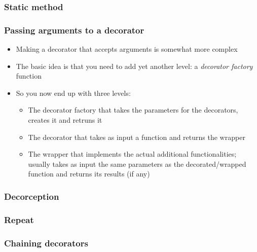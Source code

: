 \documentclass[9pt]{beamer}
\begin{document}
\begin{frame}
  \frametitle{Static method}
  
\end{frame}


\begin{frame}
  \frametitle{Passing arguments to a decorator}
  \begin{itemize}
    \item Making a decorator that accepts arguments is somewhat more complex
    \smallskip
    \item The basic idea is that you need to add yet another level: a 
          \emph{decorator factory} function
    \smallskip
    \item So you now end up with three levels:
    \smallskip
    \begin{itemize}
      \item The decorator factory that takes the parameters for the decorators, creates it and retruns it
      \item The decorator that takes as input a function and returns the wrapper
      \item The wrapper that implements the actual additional functionalities;
            usually takes as input the same parameters as the decorated/wrapped
            function and returns its results (if any)
    \end{itemize}
  \end{itemize}
\end{frame}


\begin{frame}
  \frametitle{Decorception}
  
\end{frame}


\begin{frame}
  \frametitle{Repeat}
  
\end{frame}


\begin{frame}
  \frametitle{Chaining decorators}
  
\end{frame} 
\end{document}
